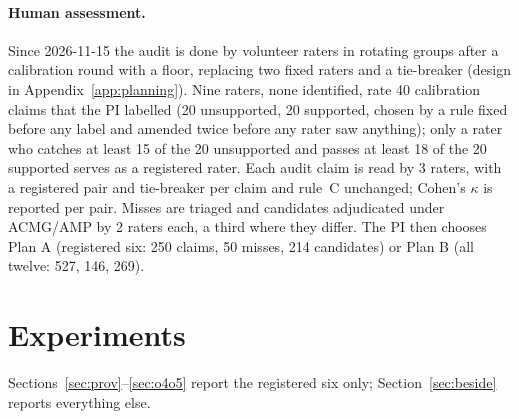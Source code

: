 \documentclass{article} %
\begin{document}
\paragraph{Human assessment.} Since 2026-11-15 the audit is done by volunteer raters in rotating groups after a calibration round with a floor, replacing two fixed raters and a tie-breaker (design in Appendix~\ref{app:planning}). Nine raters, none identified, rate 40 calibration claims that the PI labelled (20 unsupported, 20 supported, chosen by a rule fixed before any label and amended twice before any rater saw anything); only a rater who catches at least 15 of the 20 unsupported and passes at least 18 of the 20 supported serves as a registered rater. Each audit claim is read by 3 raters, with a registered pair and tie-breaker per claim and rule~C unchanged; Cohen's $\kappa$ \citep{Cohen1960CoefficientAgreement} is reported per pair. Misses are triaged and candidates adjudicated under ACMG/AMP \citep{richards2015_acmg} by 2 raters each, a third where they differ. The PI then chooses Plan A (registered six: 250 claims, 50 misses, 214 candidates) or Plan B (all twelve: 527, 146, 269).

\section{Experiments}
\label{sec:experiments}
Sections~\ref{sec:prov}--\ref{sec:o4o5} report the registered six only; Section~\ref{sec:beside} reports everything else.
\end{document}
